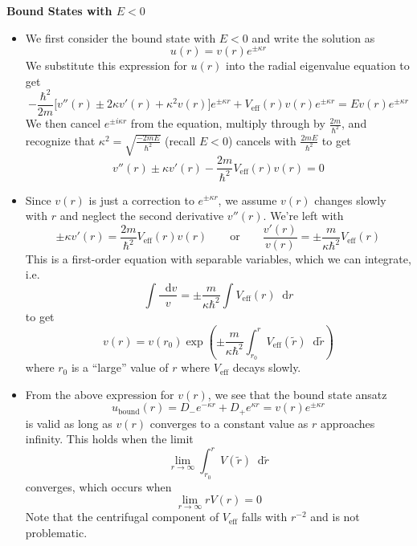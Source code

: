 \documentclass[11pt, a4paper]{article}
\newcommand{\diff}{\mathop{}\!\mathrm{d}} %
\newcommand{\eqtext}[1]{\qquad \text{#1} \qquad}
\renewcommand{\t}[1]{\tilde{#1}}
\begin{document}
\textbf{Bound States with $ E < 0 $}
\begin{itemize}
	\item We first consider the bound state with $ E < 0 $ and write the solution as
	\begin{equation*}
		u(r) = v(r) e^{\pm \kappa r}
	\end{equation*}
	We substitute this expression for $ u(r) $ into the radial eigenvalue equation to get
	\begin{equation*}
		-\frac{\hbar^{2}}{2m}\Big[v''(r) \pm 2\kappa v'(r) + \kappa^{2}v(r)\Big]e^{\pm \kappa r} + V_{\text{eff}}(r)v(r)e^{\pm \kappa r} = E v(r)e^{\pm \kappa r}
	\end{equation*}
	We then cancel $ e^{\pm i \kappa r} $ from the equation, multiply through by $ \frac{2m}{\hbar^{2}} $, and recognize that $ \kappa^{2} = \sqrt{\frac{-2mE}{\hbar^{2}}} $ (recall $ E < 0 $) cancels with $ \frac{2mE}{\hbar^{2}} $ to get
	\begin{equation*}
		v''(r) \pm \kappa v'(r) - \frac{2m}{\hbar^{2}}V_{\text{eff}}(r)v(r) = 0
	\end{equation*}
	
	\item Since $ v(r) $ is just a correction to $ e^{\pm \kappa r} $, we assume $ v(r) $ changes slowly with $ r $ and neglect the second derivative $ v''(r) $. We're left with
	\begin{equation*}
		\pm \kappa v'(r) = \frac{2m}{\hbar^{2}}V_{\text{eff}}(r)v(r) \eqtext{or} \frac{v'(r)}{v(r)} = \pm \frac{m}{\kappa \hbar^{2}}V_{\text{eff}}(r)
	\end{equation*}
	This is a first-order equation with separable variables, which we can integrate, i.e. 
	\begin{equation*}
		\int \frac{\diff v}{v} = \pm \frac{m}{\kappa \hbar^{2}} \int V_{\text{eff}}(r) \diff r
	\end{equation*}
	to get
	\begin{equation*}
		v(r) = v(r_{0}) \exp(\pm \frac{m}{\kappa \hbar^{2}}\int_{r_{0}}^{r}V_{\text{eff}}(\t{r})\diff \t{r})
	\end{equation*}
	where $ r_{0} $ is a ``large'' value of $ r $ where $ V_{\text{eff}} $ decays slowly.
	
	\item From the above expression for $ v(r) $, we see that the bound state ansatz
	\begin{equation*}
		u_{\text{bound}}(r) = D_{-}e^{-\kappa r} + D_{+}e^{\kappa r} = v(r)e^{\pm \kappa r}
	\end{equation*}
	is valid as long as $ v(r) $ converges to a constant value as $ r $ approaches infinity. This holds when the limit
	\begin{equation*}
		\lim_{r \to \infty} \int_{r_{0}}^{r}V(\t{r})\diff \t{r}
	\end{equation*}
	converges, which occurs when 
	\begin{equation*}
		\lim_{r \to \infty}rV(r) = 0
	\end{equation*}
	Note that the centrifugal component of $ V_{\text{eff}} $ falls with $ r^{-2} $ and is not problematic. 
	

\end{itemize}
\end{document}
